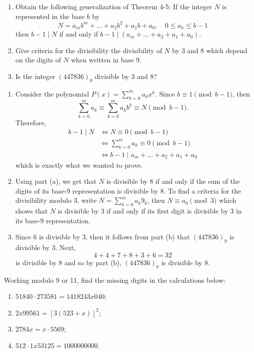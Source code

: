 \begin{exercise}
    \begin{enumerate}
        \item Obtain the following generalization of Theorem 4-5: If the integer $N$ is represented in the base $b$ by
        $$N = a_mb^m + \dots + a_2b^2 + a_1b + a_0, \quad 0 \leq a_k \leq b-1$$
        then $b-1 \mid N$ if and only if $b-1 \mid (a_m + \dots + a_2 + a_1 + a_0)$.
        \item Give criteria for the divisibility the divisibility of $N$ by 3 and 8 which depend on the digits of $N$ when written in base 9.
        \item Is the integer $(447836)_9$ divisible by 3 and 8?
    \end{enumerate}
\end{exercise}

\begin{solution}
    \begin{enumerate}
        \item Consider the polynomial $P(x) = \sum_{k=0}^{m}a_kx^k$. Since $b \equiv 1 \pmod{b-1}$, then
        $$\sum_{k=0}^{m}a_k \equiv \sum_{k=0}^{m}a_kb^k \equiv N \pmod{b-1}.$$
        Therefore,
        \begin{align*}
            b-1\mid N &\iff N \equiv 0 \pmod{b-1} \\
            &\iff \sum_{k=0}^{m}a_k \equiv 0 \pmod{b-1} \\
            &\iff b-1 \mid a_m + \dots + a_2 + a_1 + a_0
        \end{align*}
        which is exactly what we wanted to prove.
        \item Using part (a), we get that $N$ is divisible by 8 if and only if the sum of the digits of its base-9 representation is divisible by 8. To find a criteria for the divisibility modulo 3, write $N = \sum_{k=0}^{m}a_k 9_k$, then $N \equiv a_0 \pmod{3}$ which shows that $N$ is divisible by 3 if and only if its first digit is divisible by 3 in its base-9 representation.
        \item Since 6 is divisible by 3, then it follows from part (b) that $(447836)_9$ is divisible by 3. Next,
        $$4 + 4 + 7 + 8 + 3 + 6 = 32$$
        is divisible by 8 and so by part (b), $(447836)_9$ is divisible by 8.
    \end{enumerate}
\end{solution}

\begin{exercise}
    Working modulo 9 or 11, find the missing digits in the calculations below:
    \begin{enumerate}
        \item $51840 \cdot 273581 = 1418243x040$;
        \item $2x99561 = [3(523 + x)]^2$;
        \item $2784x = x \cdot 5569$;
        \item $512 \cdot 1x53125 = 1000000000$.
    \end{enumerate}
\end{exercise}

